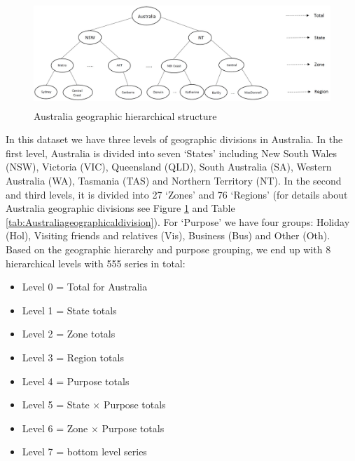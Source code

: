 \documentclass[11pt,a4paper,]{article}
\providecommand{\tightlist}{%
  \setlength{\itemsep}{0pt}\setlength{\parskip}{0pt}}
\begin{document}
\begin{figure}

{\centering \includegraphics[width=450px,height=150px]{Paper-Figures/Australian_hierarchy_structure} 

}

\caption{Australia geographic hierarchical structure}\label{fig:Australiahierarchystructure}
\end{figure}

In this dataset we have three levels of geographic divisions in
Australia. In the first level, Australia is divided into seven `States'
including New South Wales (NSW), Victoria (VIC), Queensland (QLD), South
Australia (SA), Western Australia (WA), Tasmania (TAS) and Northern
Territory (NT). In the second and third levels, it is divided into 27
`Zones' and 76 `Regions' (for details about Australia geographic
divisions see Figure \ref{fig:Australiahierarchystructure} and Table
\ref{tab:Australiageographicaldivision}). For `Purpose' we have four
groups: Holiday (Hol), Visiting friends and relatives (Vis), Business
(Bus) and Other (Oth). Based on the geographic hierarchy and purpose
grouping, we end up with 8 hierarchical levels with 555 series in total:

\begin{itemize}
\tightlist
\item
  Level 0 = Total for Australia
\item
  Level 1 = State totals
\item
  Level 2 = Zone totals
\item
  Level 3 = Region totals
\item
  Level 4 = Purpose totals
\item
  Level 5 = State \(\times\) Purpose totals
\item
  Level 6 = Zone \(\times\) Purpose totals
\item
  Level 7 = bottom level series
\end{itemize}
\end{document}
